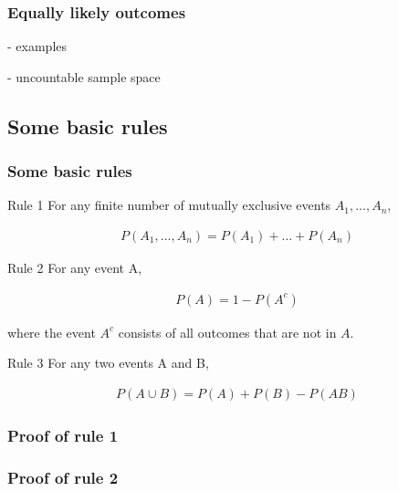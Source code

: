 \begin{frame}
    \frametitle{Equally likely outcomes}

- examples

- uncountable sample space

\end{frame}

\subsection{Some basic rules}

\begin{frame}
    \frametitle{Some basic rules}

    \begin{description}

        \item{Rule 1} For any finite number of mutually exclusive events
            $A_1,\ldots,A_n$,

            \begin{align*}
                P(A_1,\ldots,A_n) = P(A_1) + \ldots + P(A_n)
            \end{align*}

        \item{Rule 2} For any event A,

            \begin{align*}
                P(A) = 1 - P(A^c)
            \end{align*}

            where the event $A^c$ consists of all outcomes that are not in $A$.

        \item{Rule 3} For any two events A and B,

            \begin{align*}
                P(A\cup B) = P(A) + P(B) - P(AB)
            \end{align*}

    \end{description}

\end{frame}

\begin{frame}
    \frametitle{Proof of rule 1}

\end{frame}

\begin{frame}
    \frametitle{Proof of rule 2}

\end{frame}

